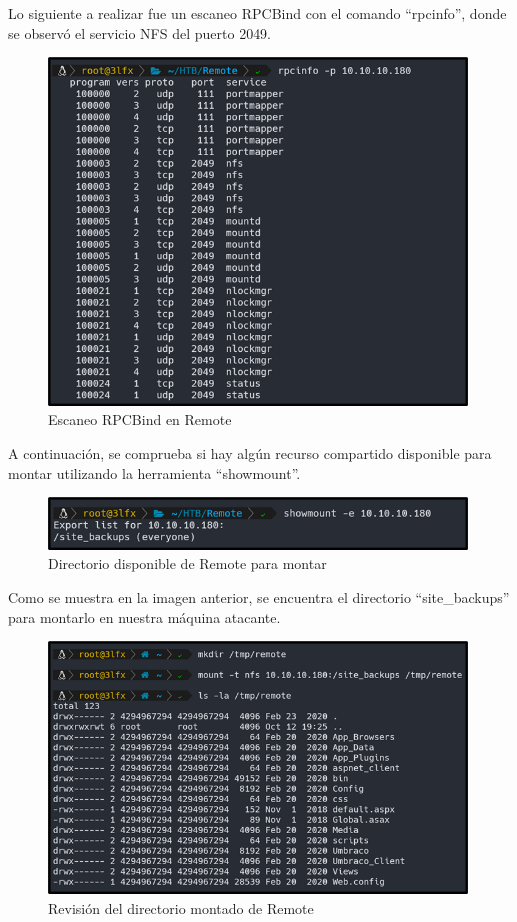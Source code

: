 \vspace{0.5cm}
Lo siguiente a realizar fue un escaneo RPCBind con el comando “rpcinfo”, donde se observó el servicio NFS del puerto 2049.
\begin{figure}[H]
    \centering
    \includegraphics[width=0.99\textwidth]{imagenes/rpcrem.png}
    \caption{Escaneo RPCBind en Remote}
\end{figure}
A continuación, se comprueba si hay algún recurso compartido disponible para montar utilizando la herramienta “showmount”.
\begin{figure}[H]
    \centering
    \includegraphics[width=0.99\textwidth]{imagenes/shmonrem.png}
    \caption{Directorio disponible de Remote para montar}
\end{figure}
Como se muestra en la imagen anterior, se encuentra el directorio “site\_backups” para montarlo en nuestra máquina atacante.
\begin{figure}[H]
    \centering
    \includegraphics[width=0.99\textwidth]{imagenes/revdicrem.png}
    \caption{Revisión del directorio montado de Remote}
\end{figure}
